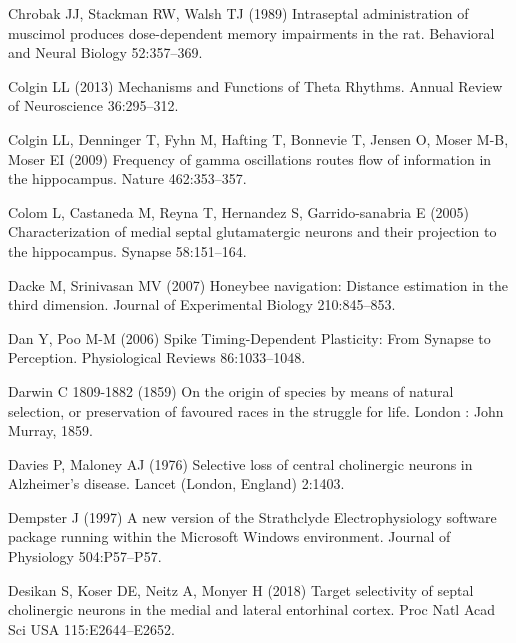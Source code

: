 \documentclass[
  12pt,
  a4paper,
  openany]{book}
\newlength{\cslhangindent}
\newlength{\cslentryspacingunit} %
\newenvironment{CSLReferences}[2] %
 {%
  \setlength{\parindent}{0pt}
  \ifodd #1
  \let\oldpar\par
  \def\par{\hangindent=\cslhangindent\oldpar}
  \fi
  \setlength{\parskip}{#2\cslentryspacingunit}
 }%
 {}
\begin{document}
\begin{CSLReferences}{1}{0}
\leavevmode{}%
Chrobak JJ, Stackman RW, Walsh TJ (1989) Intraseptal administration of muscimol produces dose-dependent memory impairments in the rat. Behavioral and Neural Biology 52:357--369.

\leavevmode{}%
Colgin LL (2013) Mechanisms and {Functions} of {Theta} {Rhythms}. Annual Review of Neuroscience 36:295--312.

\leavevmode{}%
Colgin LL, Denninger T, Fyhn M, Hafting T, Bonnevie T, Jensen O, Moser M-B, Moser EI (2009) Frequency of gamma oscillations routes flow of information in the hippocampus. Nature 462:353--357.

\leavevmode{}%
Colom L, Castaneda M, Reyna T, Hernandez S, Garrido-sanabria E (2005) Characterization of medial septal glutamatergic neurons and their projection to the hippocampus. Synapse 58:151--164.

\leavevmode{}%
Dacke M, Srinivasan MV (2007) Honeybee navigation: Distance estimation in the third dimension. Journal of Experimental Biology 210:845--853.

\leavevmode{}%
Dan Y, Poo M-M (2006) Spike {Timing}-{Dependent} {Plasticity}: {From} {Synapse} to {Perception}. Physiological Reviews 86:1033--1048.

\leavevmode{}%
Darwin C 1809-1882 (1859) On the origin of species by means of natural selection, or preservation of favoured races in the struggle for life. London : John Murray, 1859.

\leavevmode{}%
Davies P, Maloney AJ (1976) Selective loss of central cholinergic neurons in {Alzheimer}'s disease. Lancet (London, England) 2:1403.

\leavevmode{}%
Dempster J (1997) A new version of the {Strathclyde} {Electrophysiology} software package running within the {Microsoft} {Windows} environment. Journal of Physiology 504:P57--P57.

\leavevmode{}%
Desikan S, Koser DE, Neitz A, Monyer H (2018) Target selectivity of septal cholinergic neurons in the medial and lateral entorhinal cortex. Proc Natl Acad Sci USA 115:E2644--E2652.


\end{CSLReferences}
\end{document}

